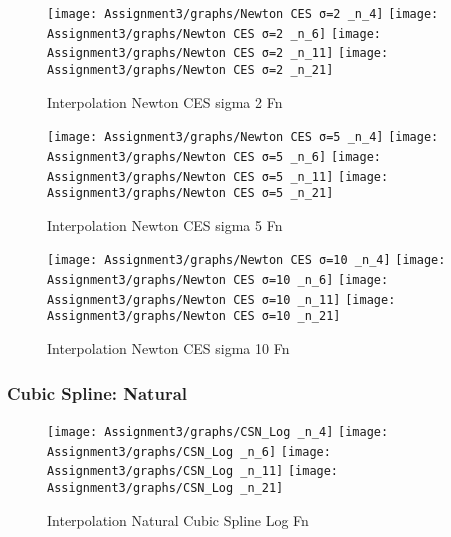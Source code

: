 \documentclass[]{article}
\begin{document}
\begin{figure}

{\centering \texttt{[image: Assignment3/graphs/Newton CES σ=2 \_n\_4]} \texttt{[image: Assignment3/graphs/Newton CES σ=2 \_n\_6]} \texttt{[image: Assignment3/graphs/Newton CES σ=2 \_n\_11]} \texttt{[image: Assignment3/graphs/Newton CES σ=2 \_n\_21]} 

}

\caption{Interpolation Newton CES sigma 2 Fn}\label{fig:unnamed-chunk-4}
\end{figure}

\begin{figure}

{\centering \texttt{[image: Assignment3/graphs/Newton CES σ=5 \_n\_4]} \texttt{[image: Assignment3/graphs/Newton CES σ=5 \_n\_6]} \texttt{[image: Assignment3/graphs/Newton CES σ=5 \_n\_11]} \texttt{[image: Assignment3/graphs/Newton CES σ=5 \_n\_21]} 

}

\caption{Interpolation Newton CES sigma 5 Fn}\label{fig:unnamed-chunk-5}
\end{figure}

\begin{figure}

{\centering \texttt{[image: Assignment3/graphs/Newton CES σ=10 \_n\_4]} \texttt{[image: Assignment3/graphs/Newton CES σ=10 \_n\_6]} \texttt{[image: Assignment3/graphs/Newton CES σ=10 \_n\_11]} \texttt{[image: Assignment3/graphs/Newton CES σ=10 \_n\_21]} 

}

\caption{Interpolation Newton CES sigma 10 Fn}\label{fig:unnamed-chunk-6}
\end{figure}

\hypertarget{cubic-spline-natural}{%
\subsubsection{Cubic Spline: Natural}\label{cubic-spline-natural}}

\begin{figure}

{\centering \texttt{[image: Assignment3/graphs/CSN\_Log \_n\_4]} \texttt{[image: Assignment3/graphs/CSN\_Log \_n\_6]} \texttt{[image: Assignment3/graphs/CSN\_Log \_n\_11]} \texttt{[image: Assignment3/graphs/CSN\_Log \_n\_21]} 

}

\caption{Interpolation Natural Cubic Spline Log Fn}\label{fig:unnamed-chunk-7}
\end{figure}
\end{document}
